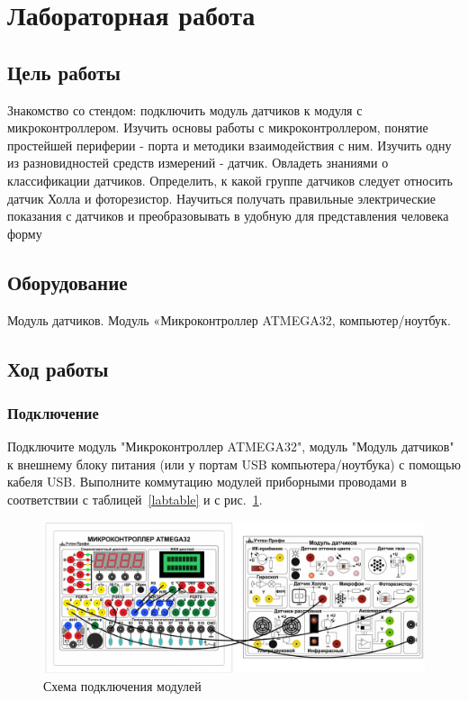 \documentclass[12pt]{article}
\begin{document}
\section{Лабораторная работа}

\subsection{Цель работы}

Знакомство со стендом: подключить модуль датчиков к модуля с микроконтроллером. Изучить основы работы с микроконтроллером, понятие простейшей периферии - порта и методики взаимодействия с ним. Изучить одну из разновидностей средств измерений - датчик. Овладеть знаниями о классификации датчиков. Определить, к какой группе датчиков следует относить датчик Холла и фоторезистор. Научиться получать правильные электрические показания с датчиков и преобразовывать в удобную для представления человека форму

\subsection{Оборудование}

Модуль датчиков. Модуль «Микроконтроллер ATMEGA32, компьютер/ноутбук.

\subsection{Ход работы}

\subsubsection{Подключение}

Подключите модуль "Микроконтроллер ATMEGA32", модуль "Модуль датчиков" к внешнему блоку питания (или у портам USB компьютера/ноутбука) с помощью кабеля USB. Выполните коммутацию модулей приборными проводами в соответствии с таблицей~\ref{labtable}  и с рис.~\ref{labscheme}.

\begin{figure}[H]
    \centering
    \includegraphics[scale=0.65]{images/lab1-scheme.png}
    \caption{Схема подключения модулей}\label{labscheme}
\end{figure}
\end{document}
